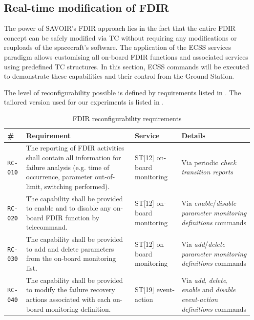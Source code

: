 \documentclass[a4paper,nobib]{tufte-book}
\begin{document}
\clearpage
\subsection{Real-time modification of \ac{FDIR}}

The power of \acs{SAVOIR}'s \ac{FDIR} approach lies in the fact that the entire \ac{FDIR} concept can be safely modified via \ac{TC} without requiring any modifications or reuploads of the spacecraft's software. The application of the \acs{ECSS} services paradigm allows customising all on-board \ac{FDIR} functions and associated services using predefined \ac{TC} structures. In this section, \acs{ECSS} commands will be executed to demonstrate these capabilities and their control from the Ground Station.

The level of reconfigurability possible is defined by requirements listed in \parencite{ECSS-E-ST-70-11C,SAVOIR-HB-003}. The tailored version used for our experiments is listed in .

\begin{table}[h]
	\centering
	\caption{\ac{FDIR} reconfigurability requirements}
	\label{tab:fdir-recon-rq}
	\begin{tabularx}{\textwidth}{@{}lXlL{4cm}@{}}
		\toprule
 		\# & Requirement & Service & Details \\ \midrule
		\texttt{RC-010} & The reporting of FDIR activities shall contain all information for failure analysis (e.g. time of occurrence, parameter out‐of‐limit, switching performed). & ST[12] on-board monitoring & Via periodic \emph{check transition reports} \\
		\texttt{RC-020} & The capability shall be provided to enable and to disable any on‐board FDIR function by telecommand. & ST[12] on-board monitoring & Via \emph{enable}/\emph{disable} \emph{parameter monitoring definitions} commands  \\
		\texttt{RC-030} & The capability shall be provided to add and delete parameters from the on‐board monitoring list. & ST[12] on-board monitoring & Via \emph{add}/\emph{delete} \emph{parameter monitoring definitions} commands  \\
		\texttt{RC-040} & The capability shall be provided to modify the failure recovery actions associated with each on-board monitoring definition. & ST[19] event-action & Via \emph{add}, \emph{delete}, \emph{enable} and \emph{disable} \emph{event-action definitions} commands \\ \bottomrule
	\end{tabularx}
\end{table}
\end{document}
